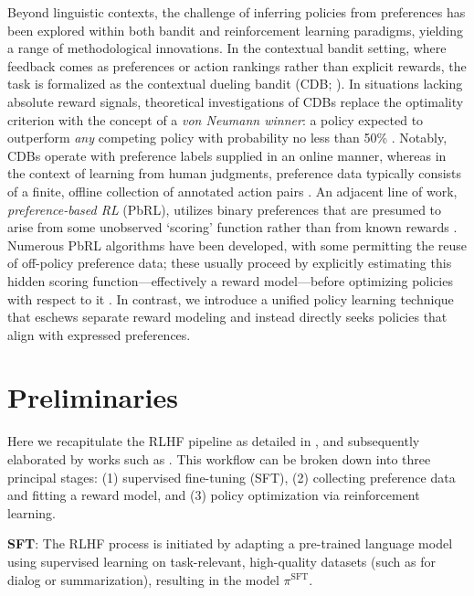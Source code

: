 Beyond linguistic contexts, the challenge of inferring policies from preferences has been explored within both bandit and reinforcement learning paradigms, yielding a range of methodological innovations. In the contextual bandit setting, where feedback comes as preferences or action rankings rather than explicit rewards, the task is formalized as the contextual dueling bandit (CDB; \cite{yue2012karmed,dudik2015contextual}). In situations lacking absolute reward signals, theoretical investigations of CDBs replace the optimality criterion with the concept of a \textit{von Neumann winner}: a policy expected to outperform \textit{any} competing policy with probability no less than 50\% \citep{dudik2015contextual}. Notably, CDBs operate with preference labels supplied in an online manner, whereas in the context of learning from human judgments, preference data typically consists of a finite, offline collection of annotated action pairs \citep{yan2022human}. An adjacent line of work, \textit{preference-based RL} (PbRL), utilizes binary preferences that are presumed to arise from some unobserved `scoring' function rather than from known rewards \citep{BusaFekete2014,ruiz2023dueling}. Numerous PbRL algorithms have been developed, with some permitting the reuse of off-policy preference data; these usually proceed by explicitly estimating this hidden scoring function—effectively a reward model—before optimizing policies with respect to it \citep{jain2013learning,BusaFekete2014,christiano2017deep,sadigh2017active,kupcsik2018learning}. In contrast, we introduce a unified policy learning technique that eschews separate reward modeling and instead directly seeks policies that align with expressed preferences.

\section{Preliminaries}\label{section:prelims}

Here we recapitulate the RLHF pipeline as detailed in \citeauthor{ziegler2020finetuning}, and subsequently elaborated by works such as \citep{stiennon2022learning, bai2022training, ouyang2022training}. This workflow can be broken down into three principal stages: (1) supervised fine-tuning (SFT), (2) collecting preference data and fitting a reward model, and (3) policy optimization via reinforcement learning.

\textbf{SFT}: The RLHF process is initiated by adapting a pre-trained language model using supervised learning on task-relevant, high-quality datasets (such as for dialog or summarization), resulting in the model $\pi^\text{SFT}$.

